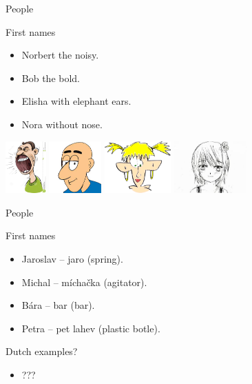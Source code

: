\begin{frame}{People}
  \begin{block}{First names}
    \begin{itemize}
      \item Norbert the noisy. 
      \item Bob the bold.
      \item Elisha with elephant ears. 
      \item Nora without nose. 
    \end{itemize}
  \end{block}
  \begin{center}
    \includegraphics[height=2cm]{img/john.jpg}
    \includegraphics[height=2cm]{img/xavier.jpg}
    \includegraphics[height=2cm]{img/nathalia.png}
    \includegraphics[height=2cm]{img/alice.jpg}
  \end{center}
\end{frame}

\begin{frame}{People}
  \begin{block}{First names}
    \begin{itemize}
      \item Jaroslav -- jaro (spring).
      \item Michal -- míchačka (agitator).
      \item Bára -- bar (bar). 
      \item Petra -- pet lahev (plastic botle).
    \end{itemize}
  \end{block}
  \begin{block}{Dutch examples?}
    \begin{itemize}
      \item ???
    \end{itemize}
  \end{block}
\end{frame}


